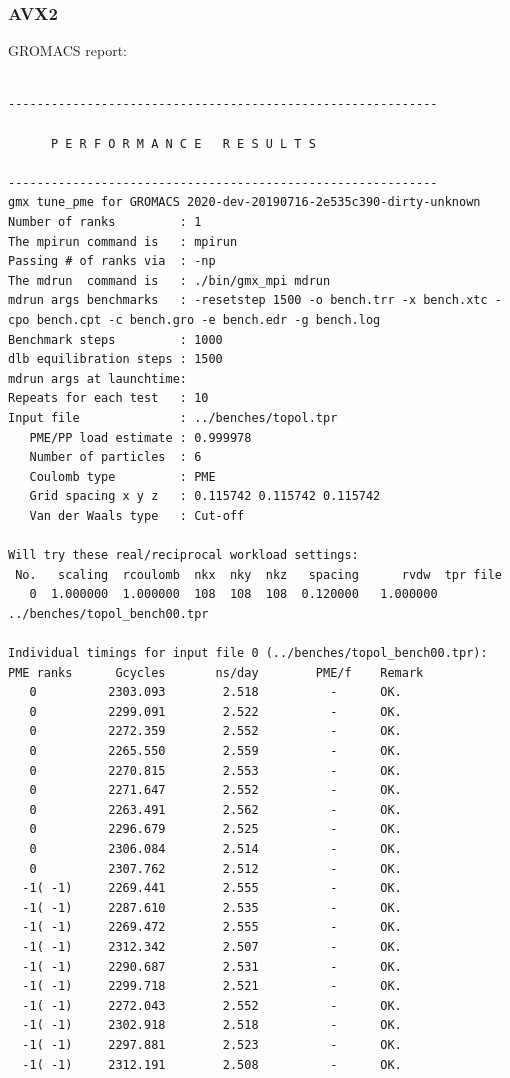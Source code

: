 \subsubsection{AVX2}
GROMACS report: \\
\begin{lstlisting}[frame=single]

------------------------------------------------------------

      P E R F O R M A N C E   R E S U L T S

------------------------------------------------------------
gmx tune_pme for GROMACS 2020-dev-20190716-2e535c390-dirty-unknown
Number of ranks         : 1
The mpirun command is   : mpirun
Passing # of ranks via  : -np
The mdrun  command is   : ./bin/gmx_mpi mdrun
mdrun args benchmarks   : -resetstep 1500 -o bench.trr -x bench.xtc -cpo bench.cpt -c bench.gro -e bench.edr -g bench.log 
Benchmark steps         : 1000
dlb equilibration steps : 1500
mdrun args at launchtime: 
Repeats for each test   : 10
Input file              : ../benches/topol.tpr
   PME/PP load estimate : 0.999978
   Number of particles  : 6
   Coulomb type         : PME
   Grid spacing x y z   : 0.115742 0.115742 0.115742
   Van der Waals type   : Cut-off

Will try these real/reciprocal workload settings:
 No.   scaling  rcoulomb  nkx  nky  nkz   spacing      rvdw  tpr file
   0  1.000000  1.000000  108  108  108  0.120000   1.000000  ../benches/topol_bench00.tpr

Individual timings for input file 0 (../benches/topol_bench00.tpr):
PME ranks      Gcycles       ns/day        PME/f    Remark
   0          2303.093        2.518          -      OK.
   0          2299.091        2.522          -      OK.
   0          2272.359        2.552          -      OK.
   0          2265.550        2.559          -      OK.
   0          2270.815        2.553          -      OK.
   0          2271.647        2.552          -      OK.
   0          2263.491        2.562          -      OK.
   0          2296.679        2.525          -      OK.
   0          2306.084        2.514          -      OK.
   0          2307.762        2.512          -      OK.
  -1( -1)     2269.441        2.555          -      OK.
  -1( -1)     2287.610        2.535          -      OK.
  -1( -1)     2269.472        2.555          -      OK.
  -1( -1)     2312.342        2.507          -      OK.
  -1( -1)     2290.687        2.531          -      OK.
  -1( -1)     2299.718        2.521          -      OK.
  -1( -1)     2272.043        2.552          -      OK.
  -1( -1)     2302.918        2.518          -      OK.
  -1( -1)     2297.881        2.523          -      OK.
  -1( -1)     2312.191        2.508          -      OK.


\end{lstlisting}
